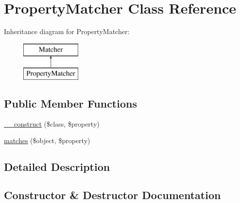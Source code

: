 \hypertarget{class_deep_copy_1_1_matcher_1_1_property_matcher}{}\section{Property\+Matcher Class Reference}
\label{class_deep_copy_1_1_matcher_1_1_property_matcher}
Inheritance diagram for Property\+Matcher\+:\begin{figure}[H]
\begin{center}
\leavevmode
\includegraphics[height=2.000000cm]{class_deep_copy_1_1_matcher_1_1_property_matcher}
\end{center}
\end{figure}
\subsection*{Public Member Functions}
\begin{DoxyCompactItemize}
\item 
\mbox{\hyperlink{class_deep_copy_1_1_matcher_1_1_property_matcher_a94a77c353cb3f6ec582462392931ea3e}{\+\_\+\+\_\+construct}} (\$class, \$property)
\item 
\mbox{\hyperlink{class_deep_copy_1_1_matcher_1_1_property_matcher_a2e9fdbe8d1a508d5c5ee7c81d27d77ea}{matches}} (\$object, \$property)
\end{DoxyCompactItemize}


\subsection{Detailed Description}


\subsection{Constructor \& Destructor Documentation}
\mbox{\label{class_deep_copy_1_1_matcher_1_1_property_matcher_a94a77c353cb3f6ec582462392931ea3e}} 
